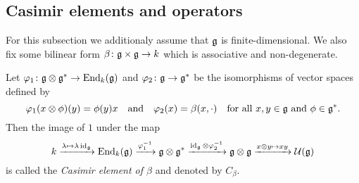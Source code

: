 

\subsection{Casimir elements and operators}
For this subsection we additionaly assume that $\mathfrak{g}$ is finite-dimensional. We also fix some bilinear form $\beta \colon \mathfrak{g} \times \mathfrak{g} \to k$ which is associative and non-degenerate.


\begin{defi}\label{defi: definition of Casimir element}
 Let $\varphi_1 \colon \mathfrak{g} \otimes \mathfrak{g}^* \to \operatorname{End}_k(\mathfrak{g})$ and $\varphi_2 \colon \mathfrak{g} \to \mathfrak{g}^*$ be the isomorphisms of vector spaces defined by
 \[
  \varphi_1(x \otimes \phi)(y) = \phi(y) x
  \quad\text{and}\quad
  \varphi_2(x) = \beta(x, \cdot)
  \quad\text{for all $x,y \in \mathfrak{g}$ and $\phi \in \mathfrak{g}^*$}.
 \]
 Then the image of $1$ under the map
 \begin{equation}\label{eqn: Casimir without coordinates}
  k
  \xrightarrow{\lambda \mapsto \lambda \operatorname{id}_{\mathfrak{g}}}
  \operatorname{End}_k(\mathfrak{g})
  \xrightarrow{\varphi_1^{-1}}
  \mathfrak{g} \otimes \mathfrak{g}^*
  \xrightarrow{\operatorname{id}_{\mathfrak{g}} \otimes \varphi_2^{-1}}
  \mathfrak{g} \otimes \mathfrak{g}
  \xrightarrow{x \otimes y \mapsto x y}
  \mathcal{U}(\mathfrak{g})
 \end{equation}
 is called the \emph{Casimir element of $\beta$} and denoted by $C_\beta$.
\end{defi}


